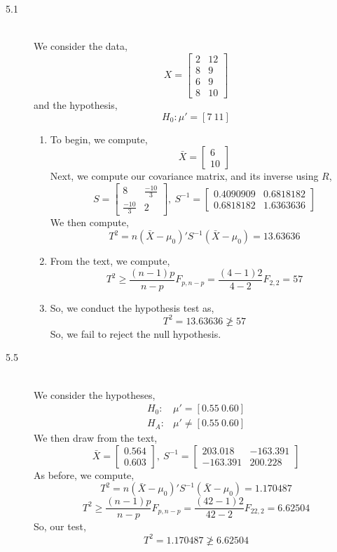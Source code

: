 \documentclass[letterpaper,10pt]{article}
\begin{document}
\begin{description}
\item[5.1] \hfill \\
We consider the data,
\[X=\begin{bmatrix}
2 & 12\\8 & 9\\6 & 9\\8 & 10
\end{bmatrix}\]
and the hypothesis,
\[H_0:\mu'=[7\ 11]\]
\begin{enumerate}[label=\alph*.]
\item To begin, we compute,
\[\bar{X}=\begin{bmatrix}
6\\10
\end{bmatrix}\]
Next, we compute our covariance matrix, and its inverse using $R$,
\[S=\begin{bmatrix}
8 & \frac{-10}{3}\\\frac{-10}{3} & 2
\end{bmatrix},\ S^{-1}=\begin{bmatrix}
0.4090909 & 0.6818182\\
0.6818182 & 1.6363636
\end{bmatrix}\]
We then compute,
\[T^2=n(\bar{X}-\mu_0)'S^{-1}(\bar{X}-\mu_0)=13.63636\]
\item From the text, we compute,
\[T^2\geq \frac{(n-1)p}{n-p}F_{p,n-p}=\frac{(4-1)2}{4-2}F_{2,2}=57\]
\item So, we conduct the hypothesis test as, 
\[T^2=13.63636\not \geq 57\]
So, we fail to reject the null hypothesis.
\end{enumerate}
\item[5.5]\hfill\\
We consider the hypotheses,
\begin{align*}
H_0:& \mu'=[0.55\ 0.60]\\
H_A:& \mu'\neq [0.55\ 0.60]
\end{align*}
We then draw from the text,
\[\bar{X}=\begin{bmatrix}
0.564\\0.603
\end{bmatrix},\ S^{-1}=\begin{bmatrix}
203.018 & -163.391\\
-163.391 & 200.228
\end{bmatrix}\]
As before, we compute,
\[T^2=n(\bar{X}-\mu_0)'S^{-1}(\bar{X}-\mu_0)=1.170487\]
\[T^2\geq \frac{(n-1)p}{n-p}F_{p,n-p}=\frac{(42-1)2}{42-2}F_{22,2}=6.62504\]
So, our test,
\[T^2=1.170487\not \geq 6.62504\]

\end{description}
\end{document}

